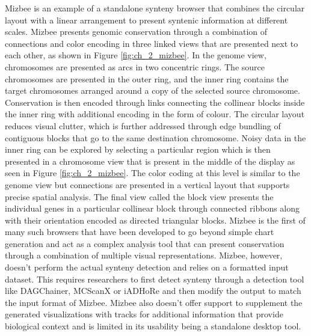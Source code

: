 Mizbee is an example of a standalone synteny browser that combines the circular layout with a linear arrangement to present syntenic information at different scales. Mizbee presents genomic conservation through a combination of connections and color encoding in three linked views that are presented next to each other, as shown in Figure \ref{fig:ch_2_mizbee}. In the genome view, chromosomes are presented as arcs in two concentric rings. The source chromosomes are presented in the outer ring, and the inner ring contains the target chromosomes arranged around a copy of the selected source chromosome. Conservation is then encoded through links connecting the collinear blocks inside the inner ring with additional encoding in the form of colour. The circular layout reduces visual clutter, which is further addressed through edge bundling of contiguous blocks that go to the same destination chromosome. Noisy data in the inner ring can be explored by selecting a particular region which is then presented in a chromosome view that is present in the middle of the display as seen in Figure \ref{fig:ch_2_mizbee}. The color coding at this level is similar to the genome view but connections are presented in a vertical layout that supports precise spatial analysis. The final view called the block view presents the individual genes in a particular collinear block through connected ribbons along with their orientation encoded as directed triangular blocks. Mizbee is the first of many such browsers that have been developed to go beyond simple chart generation and act as a complex analysis tool that can present conservation through a combination of multiple visual representations. Mizbee, however, doesn't perform the actual synteny detection and relies on a formatted input dataset. This requires researchers to first detect synteny through a detection tool like DAGChainer, MCScanX or iADHoRe and then modify the output to match the input format of Mizbee. Mizbee also doesn't offer support to supplement the generated visualizations with tracks for additional information that provide biological context and is limited in its usability being a standalone desktop tool. 

